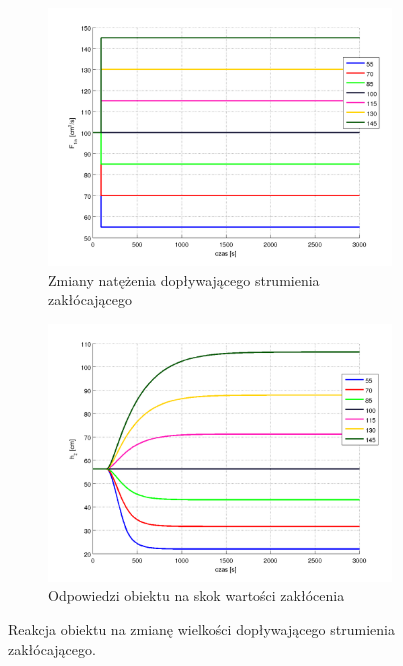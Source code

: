 \documentclass[a4paper,12pt]{article}
\begin{document}
\begin{figure}[h]
   \centering
   \begin{subfigure}[h]{0.45\textwidth}
      \includegraphics[width=\textwidth]{img/symulacja_obiektu_1a.png}
      \caption{Zmiany natężenia dopływającego strumienia zakłócającego}
   \end{subfigure}
   \begin{subfigure}[h]{0.45\textwidth}
      \includegraphics[width=\textwidth]{img/symulacja_obiektu_1b.png}
      \caption{Odpowiedzi obiektu na skok wartości zakłócenia}
   \end{subfigure}
   \caption{Reakcja obiektu na zmianę wielkości dopływającego strumienia zakłócającego.}
   \label{img:symulacja_obiektu_2}
\end{figure}
\end{document}

